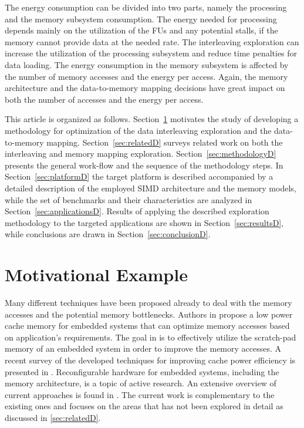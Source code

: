 The energy consumption can be divided into two parts, namely the processing and the memory subsystem consumption.  
The energy needed for processing depends mainly on the utilization of the FUs and any potential stalls, if the memory cannot provide data at the needed rate.
The interleaving exploration can increase the utilization of the processing subsystem and reduce time penalties for data loading.   
The energy consumption in the memory subsystem is affected by the number of memory accesses and the energy per access. 
Again, the memory architecture and the data-to-memory mapping decisions have great impact on both the number of accesses and the energy per access.

This article is organized as follows. 
Section~\ref{sec:motivationalD} motivates the study of developing a methodology for optimization of the data interleaving exploration and the data-to-memory mapping. 
Section~\ref{sec:relatedD} surveys related work on both the interleaving and memory mapping exploration.
Section~\ref{sec:methodologyD} presents the general work-flow and the sequence of the methodology steps.
In Section~\ref{sec:platformD} the target platform is described accompanied by a detailed description of the employed SIMD architecture and the memory models, while the set of benchmarks and their characteristics are analyzed in Section~\ref{sec:applicationsD}. 
Results of applying the described exploration methodology to the targeted applications are shown in Section~\ref{sec:resultsD}, while conclusions are drawn in Section~\ref{sec:conclusionD}. 

\section{Motivational Example}
\label{sec:motivationalD}
%
Many different techniques have been proposed already to deal with the memory accesses and the potential memory bottlenecks. 
Authors in \cite{malik2000low} propose a low power cache memory for embedded systems that can optimize memory accesses based on application's requirements.
The goal in \cite{guo2013data} is to effectively utilize the scratch-pad memory of an embedded system in order to improve the memory accesses.
A recent survey of the developed techniques for improving cache power efficiency is presented in \cite{mittal2014survey}.
Reconfigurable hardware for embedded systems, including the memory architecture, is a topic of active research. 
An extensive overview of current approaches is found in \cite{Garcia}. 
The current work is complementary to the existing ones and focuses on the areas that has not been explored in detail as discussed in \ref{sec:relatedD}.


